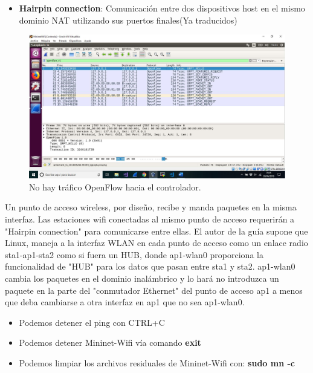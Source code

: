 \begin{itemize}
    \item \textbf{Hairpin connection}: Comunicación entre dos dispositivos host en el mismo dominio NAT utilizando sus puertos finales(Ya traducidos)
\end{itemize}
\newpage
\begin{figure}[!htb]
  \centering
    \includegraphics[width=\linewidth]{./img/8.JPG}
    \caption{No hay tráfico OpenFlow hacia el controlador.}
  \label{fig:yo}
\end{figure}
Un punto de acceso wireless, por diseño, recibe y manda paquetes en la misma interfaz. Las estaciones wifi conectadas al mismo punto de acceso requerirán a "Hairpin connection" para comunicarse entre ellas. El autor de la guía supone que Linux, maneja a la interfaz WLAN en cada punto de acceso como un enlace radio sta1-ap1-sta2 como si fuera un HUB, donde ap1-wlan0 proporciona la funcionalidad de "HUB"
para los datos que pasan entre sta1 y sta2.
ap1-wlan0 cambia los paquetes en el dominio inalámbrico y lo hará
no introduzca un paquete en la parte del "conmutador Ethernet" del punto de acceso ap1 a menos que deba cambiarse a
otra interfaz en ap1 que no sea ap1-wlan0.\newline
\newline
\begin{itemize}
    \item Podemos detener el ping con CTRL+C
    \item Podemos detener Mininet-Wifi vía comando \textbf{exit}
    \item Podemos limpiar los archivos residuales de Mininet-Wifi con:  \textbf{sudo mn -c}
\end{itemize}


